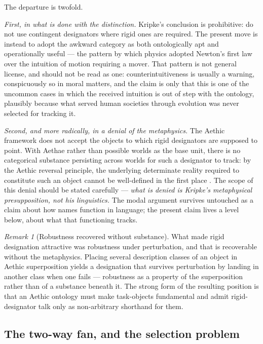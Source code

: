 \documentclass[11pt]{article}
\numberwithin{equation}{section}
\theoremstyle{plain}
\theoremstyle{definition}
\theoremstyle{remark}
\newtheorem{remark}[theorem]{Remark}
\begin{document}
The departure is twofold.

\emph{First, in what is done with the distinction.} Kripke's conclusion
is prohibitive: do not use contingent designators where rigid ones are
required. The present move is instead to adopt the awkward category as
both ontologically apt and operationally useful --- the pattern by which
physics adopted Newton's first law over the intuition of motion
requiring a mover. That pattern is not general license, and should not
be read as one: counterintuitiveness is usually a warning, conspicuously
so in moral matters, and the claim is only that this is one of the
uncommon cases in which the received intuition is out of step with the
ontology, plausibly because what served human societies through
evolution was never selected for tracking it.

\emph{Second, and more radically, in a denial of the metaphysics.} The
Aethic framework does not accept the objects to which rigid designators
are supposed to point. With Aethae rather than possible worlds as the
base unit, there is no categorical substance persisting across worlds
for such a designator to track: by the Aethic reversal principle, the
underlying determinate reality required to constitute such an object
cannot be well-defined in the first place \cite{Aethus}. The scope of
this denial should be stated carefully --- \emph{what is denied is
Kripke's metaphysical presupposition, not his linguistics.} The modal
argument survives untouched as a claim about how names function in
language; the present claim lives a level below, about what that
functioning tracks.

\begin{remark}[Robustness recovered without substance]
\label{to:rem:robustness}
What made rigid designation attractive was robustness under
perturbation, and that is recoverable without the metaphysics. Placing
several description classes of an object in Aethic superposition yields
a designation that survives perturbation by landing in another class
when one fails --- robustness as a property of the superposition rather
than of a substance beneath it. The strong form of the resulting
position is that an Aethic ontology must make task-objects fundamental
and admit rigid-designator talk only as non-arbitrary shorthand for
them.
\end{remark}

\subsection{The two-way fan, and the selection problem}
\label{to:sub:selection}
\end{document}
